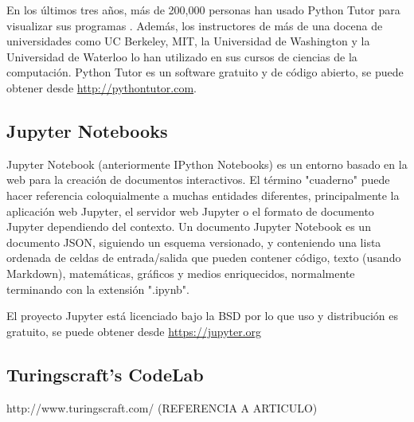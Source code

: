 En los últimos tres años, más de 200,000 personas han usado Python Tutor para visualizar sus programas \cite{GuoSIGCSE2013}. Además, los instructores de más de una docena de universidades como UC Berkeley, MIT, la Universidad de Washington y la Universidad de Waterloo lo han utilizado en sus cursos de ciencias de la computación. Python Tutor es un software gratuito y de código abierto, se puede obtener desde \url{http://pythontutor.com}.


\subsection {Jupyter Notebooks}

Jupyter Notebook (anteriormente IPython Notebooks) es un entorno basado en la web para la creación de documentos interactivos. El término "cuaderno" puede hacer referencia coloquialmente a muchas entidades diferentes, principalmente la aplicación web Jupyter, el servidor web Jupyter o el formato de documento Jupyter dependiendo del contexto. Un documento Jupyter Notebook es un documento JSON, siguiendo un esquema versionado, y conteniendo una lista ordenada de celdas de entrada/salida que pueden contener código, texto (usando Markdown), matemáticas, gráficos y medios enriquecidos, normalmente terminando con la extensión ".ipynb".

El proyecto Jupyter está licenciado bajo la BSD por lo que uso y distribución es gratuito, se puede obtener desde \url{https://jupyter.org}

\subsection {Turingscraft's CodeLab}

http://www.turingscraft.com/
(REFERENCIA A ARTICULO)




